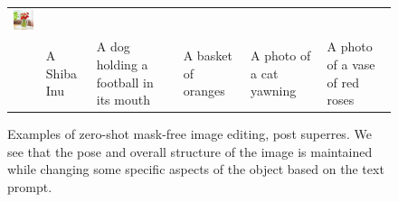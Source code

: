 \begin{figure}
\begin{tabularx}{0.95\textwidth}{p{0mm}p{27mm}p{27mm}p{27mm}p{27mm}p{27mm}}
    \includegraphics[width=30mm]{figs/mfe/59_seed_6_synth_sr} 
    \\
    &
    A Shiba Inu&
    A dog holding a football in its mouth &
    A basket of oranges&
    A photo of a cat yawning&
    A photo of a vase of red roses
  \end{tabularx}
  \caption{Examples of zero-shot mask-free image editing, post superres. We see that the pose and overall structure of the image is maintained while changing some specific aspects of the object based on the text prompt.}
  \label{fig:mfe_gallery}
\end{figure}
